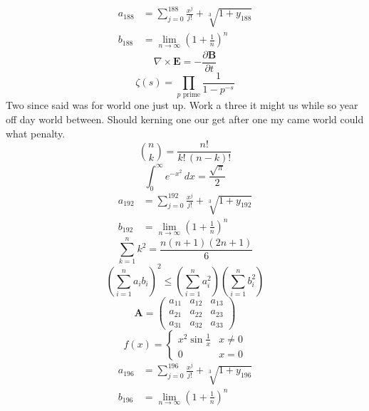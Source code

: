 \documentclass[11pt]{article}
\begin{document}
\begin{align}
  a_{188} &= \sum_{j=0}^{188} \frac{x^j}{j!} + \sqrt[3]{1+y_{188}} \\
  b_{188} &= \lim_{n\to\infty} \left(1+\frac{1}{n}\right)^{n}
\end{align}
\begin{equation}
\nabla \times \mathbf{E} = -\frac{\partial \mathbf{B}}{\partial t}
\end{equation}
\begin{equation}
\zeta(s) = \prod_{p \text{ prime}} \frac{1}{1 - p^{-s}}
\end{equation}
Two since said was for world one just up. Work a three it might us while so year off day world between. Should kerning one our get after one my came world could what penalty.
\begin{equation}
\binom{n}{k} = \frac{n!}{k!\,(n-k)!}
\end{equation}
\begin{equation}
\int_0^\infty e^{-x^2}\,dx = \frac{\sqrt{\pi}}{2}
\end{equation}
\begin{align}
  a_{192} &= \sum_{j=0}^{192} \frac{x^j}{j!} + \sqrt[3]{1+y_{192}} \\
  b_{192} &= \lim_{n\to\infty} \left(1+\frac{1}{n}\right)^{n}
\end{align}
\begin{equation}
\sum_{k=1}^{n} k^2 = \frac{n(n+1)(2n+1)}{6}
\end{equation}
\begin{equation}
\left( \sum_{i=1}^n a_i b_i \right)^2 \le \left(\sum_{i=1}^n a_i^2\right)\left(\sum_{i=1}^n b_i^2\right)
\end{equation}
\begin{equation}
\mathbf{A} = \begin{pmatrix} a_{11} & a_{12} & a_{13} \\ a_{21} & a_{22} & a_{23} \\ a_{31} & a_{32} & a_{33} \end{pmatrix}
\end{equation}
\begin{equation}
f(x) = \begin{cases} x^2 \sin\frac{1}{x} & x \ne 0 \\ 0 & x = 0 \end{cases}
\end{equation}
\begin{align}
  a_{196} &= \sum_{j=0}^{196} \frac{x^j}{j!} + \sqrt[3]{1+y_{196}} \\
  b_{196} &= \lim_{n\to\infty} \left(1+\frac{1}{n}\right)^{n}
\end{align}
\end{document}

